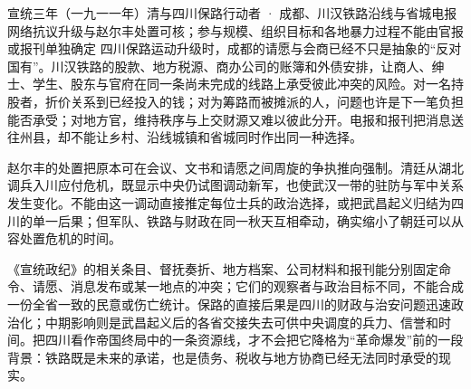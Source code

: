 \begin{event}{}{宣统三年（一九一一年）}{清与四川保路行动者 · 成都、川汉铁路沿线与省城电报网络}{抗议升级与赵尔丰处置可核；参与规模、组织目标和各地暴力过程不能由官报或报刊单独确定}
四川保路运动升级时，成都的请愿与会商已经不只是抽象的“反对国有”。川汉铁路的股款、地方税源、商办公司的账簿和外债安排，让商人、绅士、学生、股东与官府在同一条尚未完成的线路上承受彼此冲突的风险。对一名持股者，折价关系到已经投入的钱；对为筹路而被摊派的人，问题也许是下一笔负担能否承受；对地方官，维持秩序与上交财源又难以彼此分开。电报和报刊把消息送往州县，却不能让乡村、沿线城镇和省城同时作出同一种选择。

赵尔丰的处置把原本可在会议、文书和请愿之间周旋的争执推向强制。清廷从湖北调兵入川应付危机，既显示中央仍试图调动新军，也使武汉一带的驻防与军中关系发生变化。不能由这一调动直接推定每位士兵的政治选择，或把武昌起义归结为四川的单一后果；但军队、铁路与财政在同一秋天互相牵动，确实缩小了朝廷可以从容处置危机的时间。

《宣统政纪》的相关条目、督抚奏折、地方档案、公司材料和报刊能分别固定命令、请愿、消息发布或某一地点的冲突；它们的观察者与政治目标不同，不能合成一份全省一致的民意或伤亡统计。保路的直接后果是四川的财政与治安问题迅速政治化；中期影响则是武昌起义后的各省交接失去可供中央调度的兵力、信誉和时间。把四川看作帝国终局中的一条资源线，才不会把它降格为“革命爆发”前的一段背景：铁路既是未来的承诺，也是债务、税收与地方协商已经无法同时承受的现实。
\end{event}
